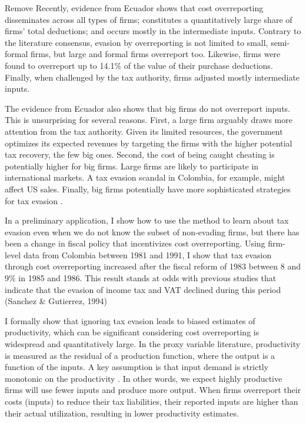 \documentclass[
  12pt]{article}
\begin{document}
\begin{anfxnote}{Remove}
Recently, evidence from Ecuador \citep{Carrillo2022} shows that cost
overreporting disseminates across all types of firms; constitutes a
quantitatively large share of firms' total deductions; and occurs mostly
in the intermediate inputs. Contrary to the literature consensus,
evasion by overreporting is not limited to small, semi-formal firms, but
large and formal firms overreport too. Likewise, firms were found to
overreport up to 14.1\% of the value of their purchase deductions.
Finally, when challenged by the tax authority, firms adjusted mostly
intermediate inputs.

The evidence from Ecuador also shows that big firms do not overreport
inputs. This is unsurprising for several reasons. First, a large firm
arguably draws more attention from the tax authority. Given its limited
resources, the government optimizes its expected revenues by targeting
the firms with the higher potential tax recovery, the few big ones.
Second, the cost of being caught cheating is potentially higher for big
firms. Large firms are likely to participate in international markets. A
tax evasion scandal in Colombia, for example, might affect US sales.
Finally, big firms potentially have more sophisticated strategies for
tax evasion \citep[e.g., profit shifting][]{Bustos2022}.

In a preliminary application, I show how to use the method to learn
about tax evasion even when we do not know the subset of non-evading
firms, but there has been a change in fiscal policy that incentivizes
cost overreporting. Using firm-level data from Colombia between 1981 and
1991, I show that tax evasion through cost overreporting increased after
the fiscal reform of 1983 between 8 and 9\% in 1985 and 1986. This
result stands at odds with previous studies that indicate that the
evasion of income tax and VAT declined during this period (Sanchez \&
Gutierrez, 1994)

I formally show that ignoring tax evasion leads to biased estimates of
productivity, which can be significant considering cost overreporting is
widespread and quantitatively large. In the proxy variable literature,
productivity is measured as the residual of a production function, where
the output is a function of the inputs. A key assumption is that input
demand is strictly monotonic on the productivity
\citep{Gandhi2020, Ackerberg2015, Levinsohn2003}. In other words, we
expect highly productive firms will use fewer inputs and produce more
output. When firms overreport their costs (inputs) to reduce their tax
liabilities, their reported inputs are higher than their actual
utilization, resulting in lower productivity estimates.


\end{anfxnote}
\end{document}
